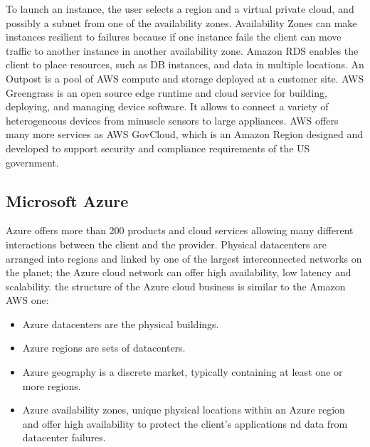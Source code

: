 To launch an instance, the user selects a region and a virtual private cloud, and possibly a subnet from one of the availability zones. Availability Zones can make instances resilient to failures because if one instance fails the client can move traffic to another instance in another availability zone. \n
Amazon RDS enables the client to place resources, such as DB instances, and data in multiple locations. \n
An Outpost is a pool of AWS compute and storage deployed at a customer site. \n
AWS Greengrass is an open source edge runtime and cloud service for building, deploying, and managing device software. It allows to connect a variety of heterogeneous devices from minuscle sensors to large appliances. \n
AWS offers many more services as AWS GovCloud, which is an Amazon Region designed and developed to support security and compliance requirements of the US government.
\subsection{Microsoft Azure}
Azure offers more than 200 products and cloud services allowing many different interactions between the client and the provider. \n
Physical datacenters are arranged into regions and linked by one of the largest interconnected networks on the planet; the Azure cloud network can offer high availability, low latency and scalability. \n
the structure of the Azure cloud business is similar to the Amazon AWS one:
\begin{itemize}
    \item Azure datacenters are the physical buildings.
    \item Azure regions are sets of datacenters.
    \item Azure geography is a discrete market, typically containing at least one or more regions.
    \item Azure availability zones, unique physical locations within an Azure region and offer high availability to protect the client's applications nd data from datacenter failures.
\end{itemize}
